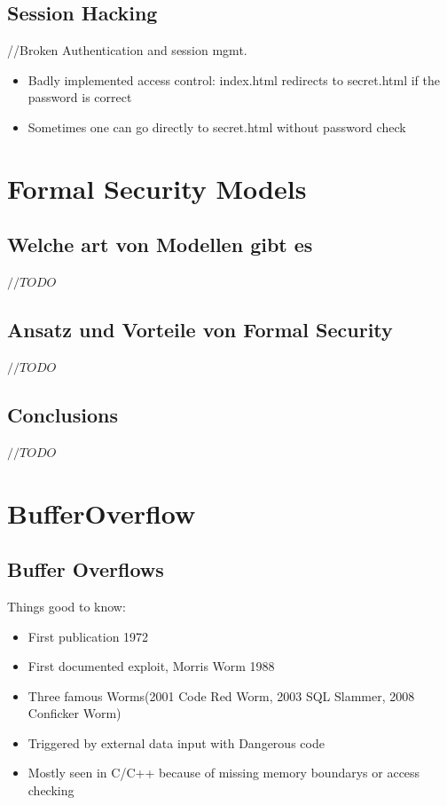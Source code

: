 \documentclass[a4paper, 12pt]{article}
\begin{document}
\subsection{Session Hacking}
//Broken Authentication and session mgmt.
\begin{itemize}
\item Badly implemented access control: index.html redirects to secret.html if the password is correct
\item Sometimes one can go directly to secret.html without password check
\end{itemize}

\section{Formal Security Models}
\subsection{Welche art von Modellen gibt es}
$ //TODO $
\subsection{Ansatz und Vorteile von Formal Security}
$ //TODO $
\subsection{Conclusions}
$ //TODO $

\section{BufferOverflow}
\subsection{Buffer Overflows}
Things good to know:
\begin{itemize}
\item First publication 1972
\item First documented exploit, Morris Worm 1988
\item Three famous Worms(2001 Code Red Worm, 2003 SQL Slammer, 2008 Conficker Worm)
\item Triggered by external data input with Dangerous code
\item Mostly seen in C/C++ because of missing memory boundarys or access checking
\end{itemize}
\end{document}
